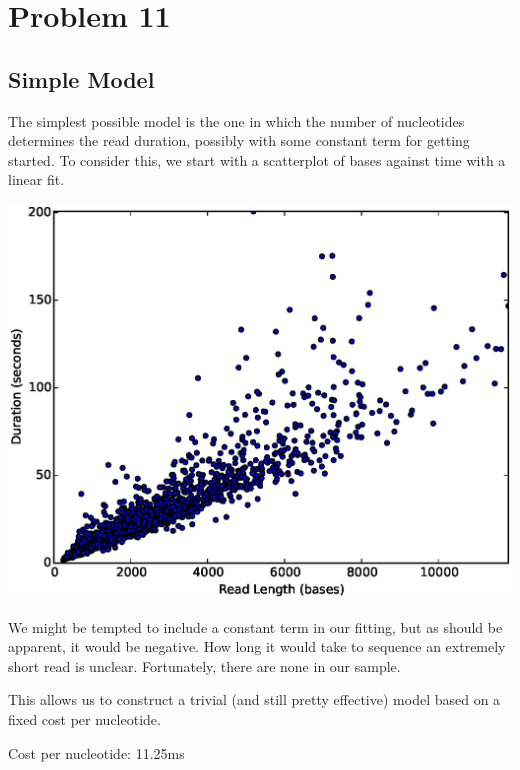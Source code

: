 \documentclass[11pt]{article}
\begin{document}
\section*{Problem 11}
\subsection*{Simple Model}

        The simplest possible model is the one in which the number of nucleotides determines the read duration,
        possibly with some constant term for getting started.  To consider this, we start with a scatterplot of
        bases against time with a linear fit.

        \begin{centering}
        \includegraphics[width=\textwidth]{part11scatterbd}
        \end{centering}

        We might be tempted to include a constant term in our fitting, but as should be apparent, it would be
        negative.  How long it would take to sequence an extremely short read is unclear.  Fortunately, there 
        are none in our sample.

        \newpage
        This allows us to construct a trivial (and still pretty effective) model based on a fixed cost per nucleotide.

        Cost per nucleotide: 11.25ms
        
\end{document}
